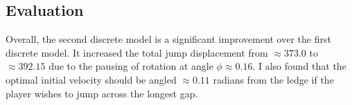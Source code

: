 %
%
%
%
%

\subsection{Evaluation}
Overall, the second discrete model is a significant improvement over the first discrete model. It increased the total jump displacement from $\approx 373.0$ to $\approx 392.15$ due to the pausing of rotation at angle $\phi \approx 0.16$. I also found that the optimal initial velocity should be angled $\approx 0.11$ radians from the ledge if the player wishes to jump across the longest gap.

